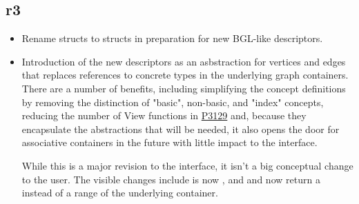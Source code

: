 \subsection*{\paperno r3}

\begin{itemize}
      \item Rename  structs to  structs in preparation for new BGL-like descriptors.
      \item Introduction of the new descriptors as an asbstraction for vertices and edges that replaces references
            to concrete types in the underlying graph containers. There are a number of benefits, including 
            simplifying the concept definitions by removing the distinction of "basic", non-basic, and "index" concepts,
            reducing the number of View functions in \href{https://www.wg21.link/P3129}{P3129} and, because they 
            encapsulate the abstractions that will be needed, it also opens the door for associative containers 
            in the future with little impact to the interface. 
            
            While this is a major revision to the interface, it isn't a big conceptual change to the user. The visible
            changes include  is now , and  and 
            now return a  instead of a range of the underlying container.
\end{itemize}
